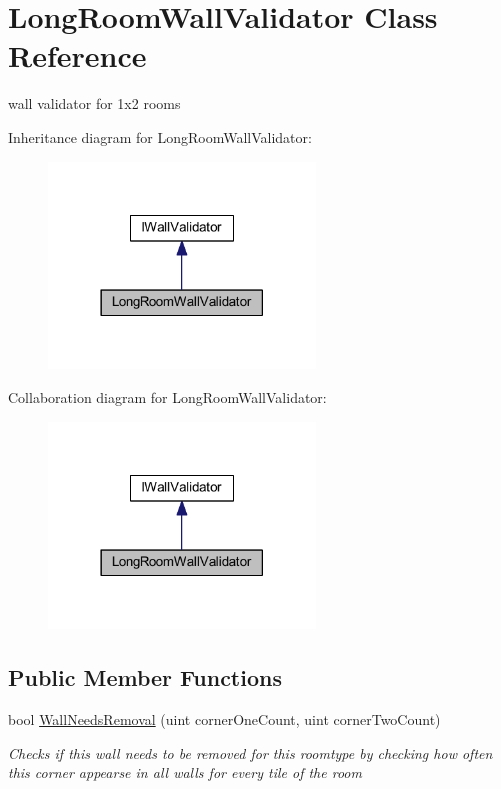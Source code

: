 \hypertarget{class_long_room_wall_validator}{}\section{Long\+Room\+Wall\+Validator Class Reference}
\label{class_long_room_wall_validator}


wall validator for 1x2 rooms  




Inheritance diagram for Long\+Room\+Wall\+Validator\+:
\nopagebreak
\begin{figure}[H]
\begin{center}
\leavevmode
\includegraphics[width=201pt]{class_long_room_wall_validator__inherit__graph}
\end{center}
\end{figure}


Collaboration diagram for Long\+Room\+Wall\+Validator\+:
\nopagebreak
\begin{figure}[H]
\begin{center}
\leavevmode
\includegraphics[width=201pt]{class_long_room_wall_validator__coll__graph}
\end{center}
\end{figure}
\subsection*{Public Member Functions}
\begin{DoxyCompactItemize}
\item 
bool \mbox{\hyperlink{class_long_room_wall_validator_a552c1bbadec7bc3ab93a3fae2e512ebe}{Wall\+Needs\+Removal}} (uint corner\+One\+Count, uint corner\+Two\+Count)
\begin{DoxyCompactList}\small\item\em Checks if this wall needs to be removed for this roomtype by checking how often this corner appearse in all walls for every tile of the room \end{DoxyCompactList}\end{DoxyCompactItemize}


